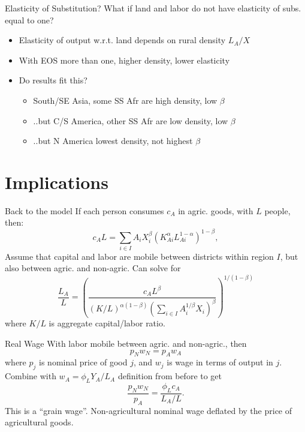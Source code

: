 \documentclass[10pt, xcolor=dvipsnames]{beamer}
\begin{document}
\begin{frame}{Elasticity of Substitution?}\label{eos}
What if land and labor do not have elasticity of subs. equal to one?
\begin{itemize}
  \item Elasticity of output w.r.t. land depends on rural density $L_A/X$
  \item With EOS more than one, higher density, lower elasticity
  \item Do results fit this?
  \begin{itemize}
    \item South/SE Asia, some SS Afr are high density, low $\beta$
    \item ..but C/S America, other SS Afr are low density, low $\beta$
    \item ..but N America lowest density, not highest $\beta$
  \end{itemize}
\end{itemize}
\hfill \hyperlink{rurdbeta}{}
\end{frame}


\section{Implications}

\begin{frame}{Back to the model}\label{extend}
If each person consumes $c_A$ in agric. goods, with $L$ people, then:
\begin{equation}
c_A L = \sum_{i \in I} A_{i} X_{i}^{\beta} \left(K_{Ai}^{\alpha}L_{Ai}^{1-\alpha}\right)^{1-\beta}, \label{EQ_caL}
\end{equation}
Assume that capital and labor are mobile between districts within region $I$, but also between agric. and non-agric. Can solve for
\begin{equation}
\frac{L_{A}}{L} = \left(\frac{c_A L^{\beta}}{(K/L)^{\alpha(1-\beta)} \left(\sum_{i \in I} A_i^{1/\beta} X_i\right)^{\beta}} \right)^{1/(1-\beta)} \label{EQ_LaL}
\end{equation}
where $K/L$ is aggregate capital/labor ratio.
\end{frame}

\begin{frame}{Real Wage}
With labor mobile between agric. and non-agric., then 
\begin{equation}
    p_N w_N = p_A w_A
\end{equation}
where $p_j$ is nominal price of good $j$, and $w_j$ is wage in terms of output in $j$. Combine with $w_A = \phi_L Y_A/L_A$ definition from before to get
\begin{equation}
    \frac{p_N w_N}{p_A} = \frac{\phi_L c_A}{L_A/L}. \label{EQ_realwage}
\end{equation}
This is a ``grain wage''. Non-agricultural nominal wage deflated by the price of agricultural goods. 
\end{frame}
\end{document}
